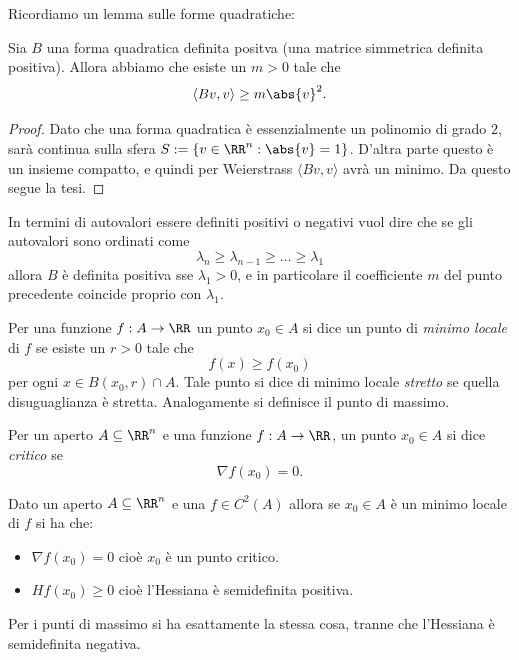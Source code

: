 \documentclass[11pt]{scrartcl}
\begin{document}
	Ricordiamo un lemma sulle forme quadratiche:
	\begin{lemma}
		Sia $B$ una forma quadratica definita positva (una matrice simmetrica definita positiva). Allora abbiamo che esiste un $m>0$ tale che		
		$$\langle Bv, v\rangle \ge m {\abs{v}}^2.$$
	\end{lemma}
	\begin{proof}
		Dato che una forma quadratica è essenzialmente un polinomio di grado $2$, sarà continua sulla sfera $S:=\left\{v\in\RR^n:\abs{v}=1\right\}$. D'altra parte questo è un insieme compatto, e quindi per Weierstrass $\langle Bv,v\rangle$ avrà un minimo. Da questo segue la tesi.
	\end{proof}
	In termini di autovalori essere definiti positivi o negativi vuol dire che se gli autovalori sono ordinati come
	$$\lambda_n\ge \lambda_{n-1}\ge \dots \ge \lambda_1$$
	allora $B$ è definita positiva sse $\lambda_1>0$, e in particolare il coefficiente $m$ del punto precedente coincide proprio con $\lambda_1$.
	\begin{definition}
		Per una funzione $f:A\to\RR$ un punto $x_0\in A$ si dice un punto di \textit{minimo locale} di $f$ se esiste un $r>0$ tale che
		$$f(x)\ge f(x_0)$$
		per ogni $x\in B(x_0,r)\cap A$. Tale punto si dice di minimo locale \textit{stretto} se quella disuguaglianza è stretta. Analogamente si definisce il punto di massimo. 
	\end{definition}
	\begin{definition}
		Per un aperto $A\subseteq\RR^n$ e una funzione $f:A\to\RR$, un punto $x_0\in A$ si dice \textit{critico} se
		$$\nabla f (x_0)=0.$$
	\end{definition}
	\begin{theorem}
		Dato un aperto $A\subseteq\RR^n$ e una $f\in C^2(A)$ allora se $x_0\in A$ è un minimo locale di $f$ si ha che:
		\begin{itemize}
			\item $\nabla f(x_0)=0$ cioè $x_0$ è un punto critico.
			\item $Hf(x_0)\ge 0$ cioè l'Hessiana è semidefinita positiva.
		\end{itemize} 
		Per i punti di massimo si ha esattamente la stessa cosa, tranne che l'Hessiana è semidefinita negativa.
	\end{theorem}
\end{document}
